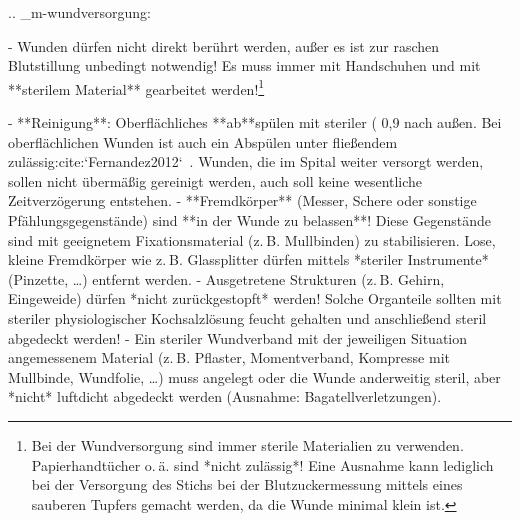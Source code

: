 
.. _m-wundversorgung:


\begin{itemize}
  -   Wunden dürfen nicht direkt berührt werden, außer es
  ist zur raschen Blutstillung unbedingt notwendig! 
Es
  muss immer mit Handschuhen und mit **sterilem Material**
  gearbeitet werden!\footnote{Bei der Wundversorgung sind
  immer sterile Materialien zu verwenden. Papierhandtücher
  o. ä. sind *nicht zulässig*! Eine Ausnahme kann
  lediglich bei der Versorgung des Stichs bei der
  Blutzuckermessung mittels eines sauberen Tupfers gemacht
  werden, da die Wunde minimal klein ist.}
  
  -   **Reinigung**: Oberflächliches **ab**spülen mit
  steriler  (
  0,9%
  nach außen. Bei oberflächlichen
  Wunden ist auch ein Abspülen unter fließendem  
  zulässig:cite:`Fernandez2012`\ . 
  Wunden, die im Spital
  weiter versorgt werden, sollen nicht übermäßig gereinigt werden, 
  auch soll keine
  wesentliche Zeitverzögerung entstehen.  
  -   **Fremdkörper** (Messer, Schere oder sonstige
  Pfählungsgegenstände) sind **in der Wunde zu belassen**!
  Diese Gegenstände sind mit geeignetem Fixationsmaterial
  (z. B. Mullbinden) zu stabilisieren. Lose, kleine
  Fremdkörper wie z. B. Glassplitter dürfen mittels *steriler Instrumente* (Pinzette, {\ldots}) entfernt
  werden.
  -   Ausgetretene Strukturen (z. B. Gehirn, Eingeweide)
  dürfen *nicht zurückgestopft* werden! Solche Organteile
  sollten mit steriler physiologischer Kochsalzlösung
feucht gehalten und anschließend steril abgedeckt werden! 
  -   Ein steriler
  Wundverband mit der jeweiligen Situation angemessenem
  Material (z. B. Pflaster, Momentverband, Kompresse mit
  Mullbinde, Wundfolie, \ldots) muss angelegt oder die
  Wunde anderweitig steril, aber *nicht* luftdicht
  abgedeckt werden (Ausnahme: Bagatellverletzungen).
\end{itemize}